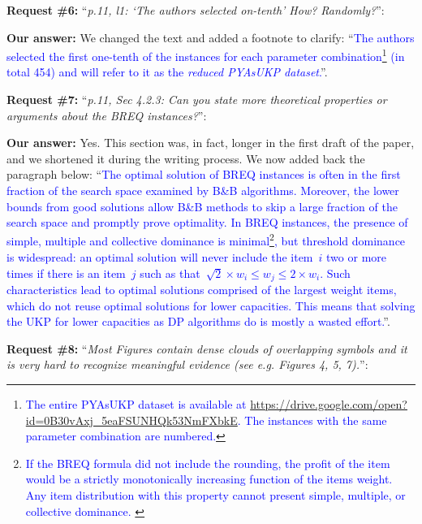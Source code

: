 \documentclass{elsarticle}
\begin{document}
\textbf{Request \#6:} ``\textit{p.11, l1: `The authors selected on-tenth' How? Randomly?}'':

\textbf{Our answer: } We changed the text and added a footnote to clarify: ``\textcolor{blue}{The authors selected the first one-tenth of the instances for each parameter combination\footnote{\textcolor{blue}{The entire PYAsUKP dataset is available at \url{https://drive.google.com/open?id=0B30vAxj_5eaFSUNHQk53NmFXbkE}. The instances with the same parameter combination are numbered.}} (in total 454) and will refer to it as the \emph{reduced PYAsUKP dataset}.}''.
\bigskip

\textbf{Request \#7:} ``\textit{p.11, Sec 4.2.3: Can you state more theoretical properties or arguments about the BREQ instances?}'':

\textbf{Our answer:}
Yes.
This section was, in fact, longer in the first draft of the paper, and we shortened it during the writing process.
We now added back the paragraph below:
``\textcolor{blue}{The optimal solution of BREQ instances is often in the first fraction of the search space examined by B\&B algorithms. Moreover, the lower bounds from good solutions allow B\&B methods to skip a large fraction of the search space and promptly prove optimality. In BREQ instances, the presence of simple, multiple and collective dominance is minimal\footnote{\textcolor{blue}{
If the BREQ formula did not include the rounding, the profit of the item would be a strictly monotonically increasing function of the items weight.
Any item distribution with this property cannot present simple, multiple, or collective dominance.
}}, but threshold dominance is widespread: an optimal solution will never include the item~\(i\) two or more times if there is an item~\(j\) such as that~\(\sqrt{2} \times w_i \leq w_j \leq 2 \times w_i\).
Such characteristics lead to optimal solutions comprised of the largest weight items, which do not reuse optimal solutions for lower capacities.
This means that solving the UKP for lower capacities as DP algorithms do is mostly a wasted effort.}''.
\bigskip

\textbf{Request \#8:} ``\textit{Most Figures contain dense clouds of overlapping symbols and it is very hard to recognize meaningful evidence (see e.g. Figures 4, 5, 7).}'':
\end{document}
